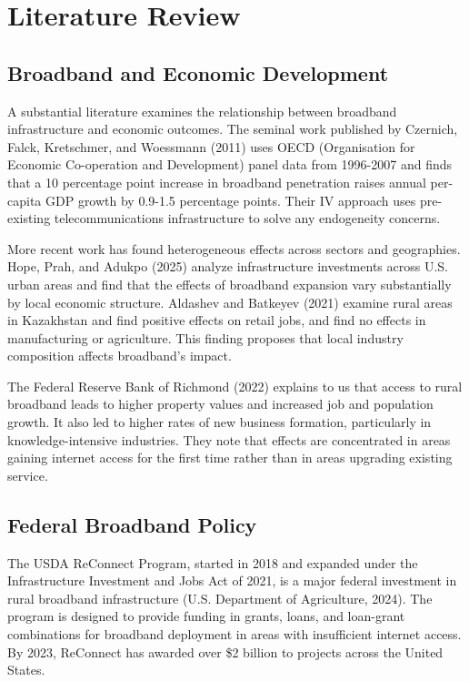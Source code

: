 \documentclass[12pt]{article}
\begin{document}
\section{Literature Review}

\subsection{Broadband and Economic Development}

A substantial literature examines the relationship between broadband infrastructure and economic outcomes. The seminal work published by Czernich, Falck, Kretschmer, and Woessmann (2011) uses OECD (Organisation for Economic Co-operation and Development) panel data from 1996-2007 and finds that a 10 percentage point increase in broadband penetration raises annual per-capita GDP growth by 0.9-1.5 percentage points. Their IV approach uses pre-existing telecommunications infrastructure to solve any endogeneity concerns.

More recent work has found heterogeneous effects across sectors and geographies. Hope, Prah, and Adukpo (2025) analyze infrastructure investments across U.S. urban areas and find that the effects of broadband expansion vary substantially by local economic structure. Aldashev and Batkeyev (2021) examine rural areas in Kazakhstan and find positive effects on retail jobs, and find no effects in manufacturing or agriculture. This finding proposes that local industry composition affects broadband’s impact.

The Federal Reserve Bank of Richmond (2022) explains to us that access to rural broadband leads to higher property values and increased job and population growth. It also led to higher rates of new business formation, particularly in knowledge-intensive industries. They note that effects are concentrated in areas gaining internet access for the first time rather than in areas upgrading existing service.

\subsection{Federal Broadband Policy}

The USDA ReConnect Program, started in 2018 and expanded under the Infrastructure Investment and Jobs Act of 2021, is a major federal investment in rural broadband infrastructure (U.S. Department of Agriculture, 2024). The program is designed to provide funding in grants, loans, and loan-grant combinations for broadband deployment in areas with insufficient internet access. By 2023, ReConnect has awarded over \$2 billion to projects across the United States.
\end{document}
